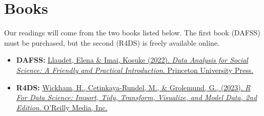 \documentclass[11pt, letterpaper]{article}
\begin{document}
\section*{Books}

Our readings will come from the two books listed below. The first book (DAFSS) must be purchased, but the second (R4DS) is freely available online.


\begin{itemize}


\item \textbf{DAFSS:}  \href{https://press.princeton.edu/books/paperback/9780691199436/data-analysis-for-social-science}{Llaudet, Elena \& Imai, Kosuke (2022). \textit{Data Analysis for Social Science: A Friendly and Practical Introduction}. Princeton University Press.}

\item \textbf{R4DS:} \href{https://r4ds.hadley.nz/}{Wickham, H., Cetinkaya-Rundel, M., \& Grolemund, G., (2023). \textit{R For Data Science: Import, Tidy, Transform, Visualize, and Model Data, 2nd Edition}. O'Reilly Media, Inc.}





\end{itemize}
\end{document}
